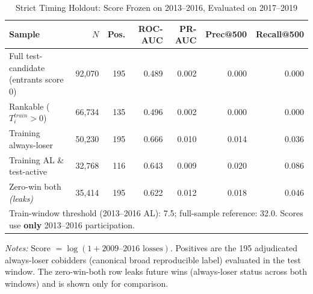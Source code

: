 \begin{table}[htbp]\centering
\caption{Strict Timing Holdout: Score Frozen on 2013--2016, Evaluated on 2017--2019}
\label{tab:strict_timing_holdout}
\footnotesize
\begin{tabular}{lrrrrrr}
\toprule
Sample & $N$ & Pos. & ROC-AUC & PR-AUC & Prec@500 & Recall@500 \\
\midrule
Full test-candidate (entrants score 0) & 92,070 & 195 & 0.489 & 0.002 & 0.000 & 0.000 \\
Rankable ($T_{i}^{train}>0$) & 66,734 & 135 & 0.496 & 0.002 & 0.000 & 0.000 \\
Training always-loser & 50,230 & 195 & 0.666 & 0.010 & 0.014 & 0.036 \\
Training AL \& test-active & 32,768 & 116 & 0.643 & 0.009 & 0.020 & 0.086 \\
Zero-win both \textit{(leaks)} & 35,414 & 195 & 0.622 & 0.012 & 0.018 & 0.046 \\
\midrule
\multicolumn{7}{l}{\footnotesize Train-window threshold (2013--2016 AL): 7.5; full-sample reference: 32.0. Scores use \textbf{only} 2013--2016 participation.} \\
\bottomrule
\end{tabular}
\begin{minipage}{\linewidth}\vspace{2pt}\footnotesize
\textit{Notes:} Score $=\log(1+\text{2009--2016 losses})$. Positives are the 195 adjudicated always-loser cobidders (canonical broad reproducible label) evaluated in the test window. The zero-win-both row leaks future wins (always-loser status across both windows) and is shown only for comparison.
\end{minipage}
\end{table}

